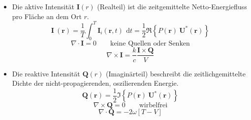 \begin{itemize}
\item Die aktive Intensität $\mathbf{I}(r)$ (Realteil) ist die zeitgemittelte Netto-Energiefluss pro Fläche an dem Ort $r$.
\begin{equation}
	\mathbf{I}~(\mathbf{r}) = \frac{1}{T}\int_0^T \mathbf{I}_i(\mathbf{r},t)\,~\mathrm{d}t = \frac{1}{2}\Re\left\{P(\mathbf{r})~\mathbf{U}^*(\mathbf{r})\right\}
	\end{equation}
\begin{equation}
	\nabla \cdot \mathbf{I} = 0 \qquad \text{keine Quellen oder Senken}
\end{equation}
\begin{equation}
	\nabla \times \mathbf{I} = \frac{k}{c} \frac{\mathbf{I} \times \mathbf{Q}}{V}
\end{equation}
\item Die reaktive Intensität $\mathbf{Q}(r)$ (Imaginärteil) beschreibt die zeitlichgemittelte Dichte der nicht-propagierenden, oszilierenden Energie. 
\begin{equation}
	\mathbf{Q}(\mathbf{r}) = \frac{1}{2}\Im\left\{P(\mathbf{r})~\mathbf{U}^*(\mathbf{r})\right\}
	\label{helmholtz:equationReaktiveIntensitaet}
	\end{equation}
\begin{equation}
	\nabla \times \mathbf{Q} = 0 \qquad \text{wirbelfrei}
\end{equation}
\begin{equation}
	\nabla \cdot \mathbf{Q} = -2 \omega [T-V]
\end{equation}
\end{itemize}